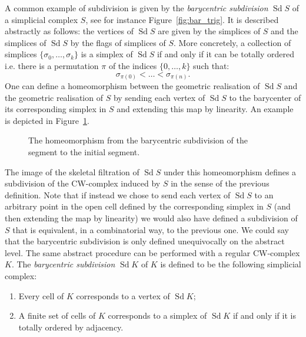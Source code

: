 \documentclass[AHL,Unicode,longabstracts,published]{cedram}
\DeclareMathOperator{\Sd}{Sd}
\begin{document}
A common example of subdivision is given by the \emph{barycentric subdivision} $\Sd S$ of a simplicial complex $S$, see for instance Figure~\ref{fig:bar_trig}. It is described abstractly as follows: the vertices of $\Sd S$ are given by the simplices of $S$ and the simplices of $\Sd S$ by the flags of simplices of $S$. More concretely, a collection of simplices $\{\sigma_0,\dots,\sigma_k\}$ is a simplex of $\Sd S$ if and only if it can be totally ordered i.e. there is a permutation $\pi$ of the indices $\{0,\dots,k\}$ such that:
\begin{equation*}
\sigma_{\pi(0)} <\dots < \sigma_{\pi(n)}.
\end{equation*}
One can define a homeomorphism between the geometric realisation of $\Sd S$ and the geometric realisation of $S$ by sending each vertex of $\Sd S$ to the barycenter of its corresponding simplex in $S$ and extending this map by linearity. An example is depicted in Figure~\ref{fig:homeo_segment}.
\begin{figure}[h]
\centering
{}
\caption{The homeomorphism from the barycentric subdivision of the segment to the initial segment.}\label{fig:homeo_segment}
\end{figure}

The image of the skeletal filtration of $\Sd S$ under this homeomorphism defines a subdivision of the CW-complex induced by $S$ in the sense of the previous definition. Note that if instead we chose to send each vertex of $\Sd S$ to an arbitrary point in the open cell defined by the corresponding simplex in $S$ (and then extending the map by linearity) we would also have defined a subdivision of $S$ that is equivalent, in a combinatorial way, to the previous one. We could say that the barycentric subdivision is only defined unequivocally on the abstract level. The same abstract procedure can be performed with a regular CW-complex $K$. The \emph{barycentric subdivision} $\Sd K$ of $K$ is defined to be the following simplicial complex:
\begin{enumerate}
\item Every cell of $K$ corresponds to a vertex of $\Sd K$;
\item A finite set of cells of $K$ corresponds to a simplex of $\Sd K$ if and only if it is totally ordered by adjacency.
\end{enumerate}
\end{document}
